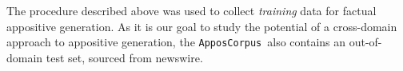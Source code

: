 \documentclass[11pt]{article}
\newcommand{\corpus}{\texttt{ApposCorpus}}
\begin{document}
The procedure described above was used to collect \textit{training} data for factual appositive generation. As it is our goal to study the potential of a cross-domain approach to appositive generation, the \corpus~also contains an out-of-domain test set, sourced from newswire. 

\end{document}
